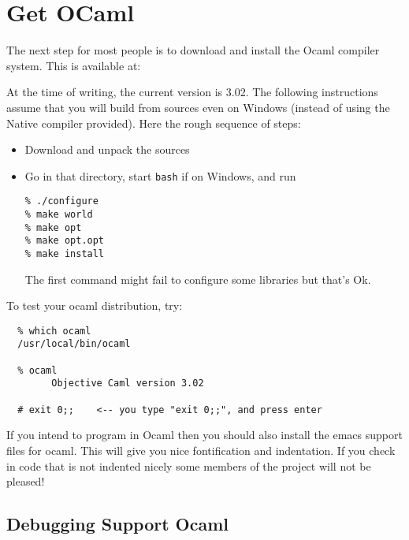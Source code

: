 \documentclass{article}
\def\t#1{{\tt #1}}
\begin{document}
\section{Get OCaml}\label{sec-ocaml}

The next step for most people is to download and install the Ocaml
compiler system.  This is available at:


At the time of writing, the current version is 3.02. The following
instructions assume that you will build from sources even on Windows (instead
of using the Native compiler provided). Here the rough sequence of steps:
\begin{itemize}
\item Download and unpack the sources
\item Go in that directory, start \t{bash} if on Windows, and run
\begin{verbatim}
% ./configure
% make world
% make opt
% make opt.opt
% make install
\end{verbatim}

 The first command might fail to configure some libraries but that's Ok. 
\end{itemize}

To test your ocaml distribution, try:

\begin{verbatim}
  % which ocaml
  /usr/local/bin/ocaml

  % ocaml
        Objective Caml version 3.02

  # exit 0;;    <-- you type "exit 0;;", and press enter
\end{verbatim}

 If you intend to program in Ocaml then you should also install the emacs
support files for ocaml. This will give you nice fontification and
indentation. If you check in code that is not indented nicely some members of
the project will not be pleased!

 \subsection{Debugging Support Ocaml}
\end{document}
